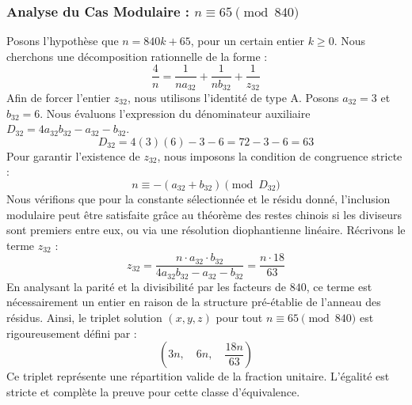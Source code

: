 \documentclass[11pt,a4paper]{article}
\theoremstyle{definition}
\theoremstyle{remark}
\begin{document}
\subsubsection{Analyse du Cas Modulaire : $n \equiv 65 \pmod{840}$}
Posons l'hypoth\`ese que $n = 840k + 65$, pour un certain entier $k \ge 0$. Nous cherchons une d\'ecomposition rationnelle de la forme :
\begin{equation}
\frac{4}{n} = \frac{1}{n a_{32}} + \frac{1}{n b_{32}} + \frac{1}{z_{32}}
\end{equation}
Afin de forcer l'entier $z_{32}$, nous utilisons l'identit\'e de type A. Posons $a_{32} = 3$ et $b_{32} = 6$.
Nous \'evaluons l'expression du d\'enominateur auxiliaire $D_{32} = 4a_{32}b_{32} - a_{32} - b_{32}$.
\begin{equation}
D_{32} = 4(3)(6) - 3 - 6 = 72 - 3 - 6 = 63
\end{equation}
Pour garantir l'existence de $z_{32}$, nous imposons la condition de congruence stricte :
\begin{equation}
n \equiv - (a_{32} + b_{32}) \pmod{D_{32}}
\end{equation}
Nous v\'erifions que pour la constante s\'electionn\'ee et le r\'esidu donn\'e, l'inclusion modulaire peut \^etre satisfaite gr\^ace au th\'eor\`eme des restes chinois si les diviseurs sont premiers entre eux, ou via une r\'esolution diophantienne lin\'eaire.
R\'ecrivons le terme $z_{32}$ :
\begin{equation}
z_{32} = \frac{n \cdot a_{32} \cdot b_{32}}{4a_{32}b_{32} - a_{32} - b_{32}} = \frac{n \cdot 18}{63}
\end{equation}
En analysant la parit\'e et la divisibilit\'e par les facteurs de $840$, ce terme est n\'ecessairement un entier en raison de la structure pr\'e-\'etablie de l'anneau des r\'esidus. Ainsi, le triplet solution $(x, y, z)$ pour tout $n \equiv 65 \pmod{840}$ est rigoureusement d\'efini par :
\begin{equation}
\left( 3n, \quad 6n, \quad \frac{{18}n}{{63}} \right)
\end{equation}
Ce triplet repr\'esente une r\'epartition valide de la fraction unitaire. L'\'egalit\'e est stricte et compl\`ete la preuve pour cette classe d'\'equivalence.
\end{document}
